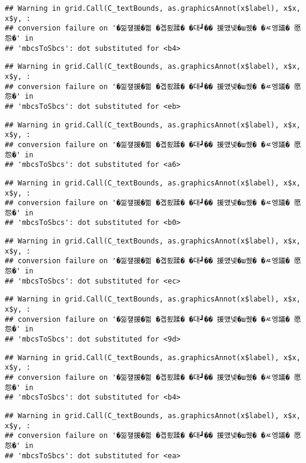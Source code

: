 \documentclass[
]{article}
\begin{document}
\begin{verbatim}
## Warning in grid.Call(C_textBounds, as.graphicsAnnot(x$label), x$x, x$y, :
## conversion failure on '�낆쟾援�쁾 �곕룄蹂� �대┛�� 援먰넻�ш퀬� �ㅼ엥議� 愿怨�' in
## 'mbcsToSbcs': dot substituted for <b4>
\end{verbatim}

\begin{verbatim}
## Warning in grid.Call(C_textBounds, as.graphicsAnnot(x$label), x$x, x$y, :
## conversion failure on '�낆쟾援�쁾 �곕룄蹂� �대┛�� 援먰넻�ш퀬� �ㅼ엥議� 愿怨�' in
## 'mbcsToSbcs': dot substituted for <eb>
\end{verbatim}

\begin{verbatim}
## Warning in grid.Call(C_textBounds, as.graphicsAnnot(x$label), x$x, x$y, :
## conversion failure on '�낆쟾援�쁾 �곕룄蹂� �대┛�� 援먰넻�ш퀬� �ㅼ엥議� 愿怨�' in
## 'mbcsToSbcs': dot substituted for <a6>
\end{verbatim}

\begin{verbatim}
## Warning in grid.Call(C_textBounds, as.graphicsAnnot(x$label), x$x, x$y, :
## conversion failure on '�낆쟾援�쁾 �곕룄蹂� �대┛�� 援먰넻�ш퀬� �ㅼ엥議� 愿怨�' in
## 'mbcsToSbcs': dot substituted for <b0>
\end{verbatim}

\begin{verbatim}
## Warning in grid.Call(C_textBounds, as.graphicsAnnot(x$label), x$x, x$y, :
## conversion failure on '�낆쟾援�쁾 �곕룄蹂� �대┛�� 援먰넻�ш퀬� �ㅼ엥議� 愿怨�' in
## 'mbcsToSbcs': dot substituted for <ec>
\end{verbatim}

\begin{verbatim}
## Warning in grid.Call(C_textBounds, as.graphicsAnnot(x$label), x$x, x$y, :
## conversion failure on '�낆쟾援�쁾 �곕룄蹂� �대┛�� 援먰넻�ш퀬� �ㅼ엥議� 愿怨�' in
## 'mbcsToSbcs': dot substituted for <9d>
\end{verbatim}

\begin{verbatim}
## Warning in grid.Call(C_textBounds, as.graphicsAnnot(x$label), x$x, x$y, :
## conversion failure on '�낆쟾援�쁾 �곕룄蹂� �대┛�� 援먰넻�ш퀬� �ㅼ엥議� 愿怨�' in
## 'mbcsToSbcs': dot substituted for <b4>
\end{verbatim}

\begin{verbatim}
## Warning in grid.Call(C_textBounds, as.graphicsAnnot(x$label), x$x, x$y, :
## conversion failure on '�낆쟾援�쁾 �곕룄蹂� �대┛�� 援먰넻�ш퀬� �ㅼ엥議� 愿怨�' in
## 'mbcsToSbcs': dot substituted for <ea>
\end{verbatim}
\end{document}
